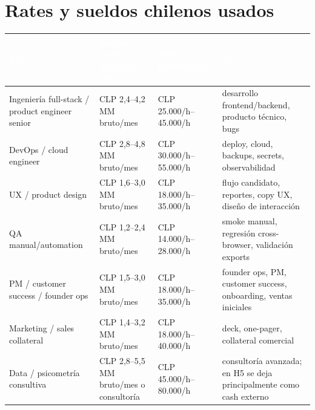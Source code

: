 \documentclass[11pt,a4paper]{article}
\begin{document}
\section{Rates y sueldos chilenos usados}
\small
\begin{tabularx}{\linewidth}{@{}p{4.3cm}p{3.1cm}p{3.2cm}X@{}}
\toprule
\rowcolor{KDark}\textcolor{white}{\textbf{Rol}} & \textcolor{white}{\textbf{Sueldo bruto mensual ref.}} & \textcolor{white}{\textbf{Rate planificación}} & \textcolor{white}{\textbf{Uso}} \\
\midrule
Ingeniería full-stack / product engineer senior & CLP 2,4--4,2 MM bruto/mes & CLP 25.000/h--45.000/h & desarrollo frontend/backend, producto técnico, bugs \\
DevOps / cloud engineer & CLP 2,8--4,8 MM bruto/mes & CLP 30.000/h--55.000/h & deploy, cloud, backups, secrets, observabilidad \\
UX / product design & CLP 1,6--3,0 MM bruto/mes & CLP 18.000/h--35.000/h & flujo candidato, reportes, copy UX, diseño de interacción \\
QA manual/automation & CLP 1,2--2,4 MM bruto/mes & CLP 14.000/h--28.000/h & smoke manual, regresión cross-browser, validación exports \\
PM / customer success / founder ops & CLP 1,5--3,0 MM bruto/mes & CLP 18.000/h--35.000/h & founder ops, PM, customer success, onboarding, ventas iniciales \\
Marketing / sales collateral & CLP 1,4--3,2 MM bruto/mes & CLP 18.000/h--40.000/h & deck, one-pager, collateral comercial \\
Data / psicometría consultiva & CLP 2,8--5,5 MM bruto/mes o consultoría & CLP 45.000/h--80.000/h & consultoría avanzada; en H5 se deja principalmente como cash externo \\

\bottomrule
\end{tabularx}
\normalsize
\end{document}
